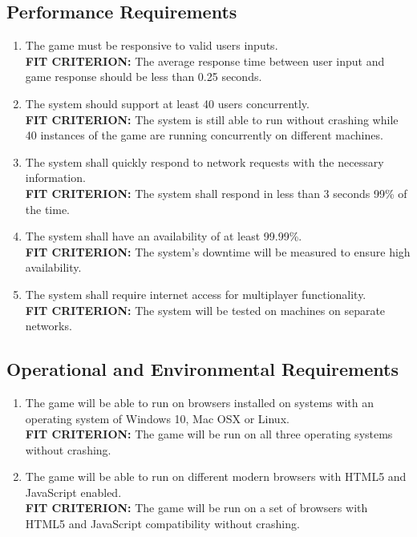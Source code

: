 \documentclass[12pt, titlepage]{article}
\begin{document}
\subsection{Performance Requirements}
\begin{enumerate}[{PR}1. ]
    \item The game must be responsive to valid users inputs. 
    \\\textbf{FIT CRITERION:} The average response time between user input and game response should be less than 0.25 seconds.
    
    \item The system should support at least 40 users concurrently.
    \\\textbf{FIT CRITERION:} The system is still able to run without crashing while 40 instances of the game are running concurrently on different machines. 
    
    \item The system shall quickly respond to network requests with the necessary information.
    \\\textbf{FIT CRITERION:} The system shall respond in less than 3 seconds 99\% of the time.
    
    \item The system shall have an availability of at least 99.99\%.
    \\\textbf{FIT CRITERION:} The system's downtime will be measured to ensure high availability.
    
	\item The system shall require internet access for multiplayer functionality.
	\\\textbf{FIT CRITERION:} The system will be tested on machines on separate networks.

\end{enumerate}

\subsection{Operational and Environmental Requirements}
\begin{enumerate}[{OER}1. ]
    \item The game will be able to run on browsers installed on systems with an operating system of Windows 10, Mac OSX or Linux.
    \\\textbf{FIT CRITERION:} The game will be run on all three operating systems without crashing. 
    
    \item The game will be able to run on different modern browsers with HTML5 and JavaScript enabled.
    \\\textbf{FIT CRITERION:} The game will be run on a set of browsers with HTML5 and JavaScript compatibility without crashing. 
\end{enumerate}
\end{document}
